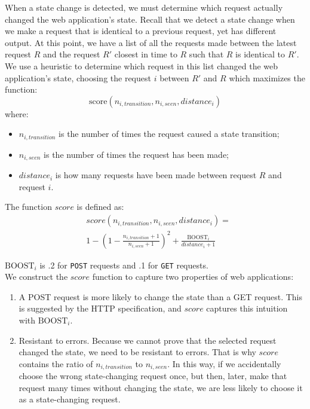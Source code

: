 When a state change is detected, we must determine which request actually
changed the web application's state. Recall that we detect a state change when
we make a request that is identical to a previous request, yet has different
output. At this point, we have a list of all the requests made between the
latest request $R$ and the request $R'$ closest in time to $R$ such that $R$ is
identical to $R'$. We use a heuristic to determine which request in this list
changed the web application's state, choosing the request $i$ between $R'$ and
$R$ which maximizes the function:
\[
\text{score}(n_{i,transition}, n_{i,seen}, distance_i)
\]
\noindent{}where:
\begin{itemize}
 \item $n_{i,transition}$ is the number of times the request caused a state transition;
 \item $n_{i,seen}$ is the number of times the request has been made;
 \item $distance_i$ is how many requests have been made between request $R$ and
   request $i$.
\end{itemize}

The function \noindent{}$score$ is defined as:\\
\[
\begin{array}{ll}
&score(n_{i,transition}, n_{i,seen}, distance_i) = \\
&1-(1 - \frac{n_{i,transition} +1}{n_{i,seen} + 1})^2+\frac{\text{BOOST}_i}{distance_i + 1}
\end{array}
\]

\noindent{}$\text{BOOST}_i$ is .2 for \texttt{POST} requests and .1 for \texttt{GET}
requests. \\

We construct the $score$ function to capture two properties of web applications:
\begin{enumerate}
\item{}A POST request is more likely to change the state than a GET request. This is
suggested by the HTTP specification, and $score$ captures this intuition with
$\text{BOOST}_i$.

\item{}Resistant to errors. Because we cannot prove that the selected request
  changed the state, we need to be resistant to errors. That is why $score$
  contains the ratio of $n_{i,transition}$ to $n_{i,seen}$. In this way, if we
  accidentally choose the wrong state-changing request once, but then, later,
  make that request many times without changing the state, we are less likely
  to choose it as a state-changing request.
\end{enumerate}

